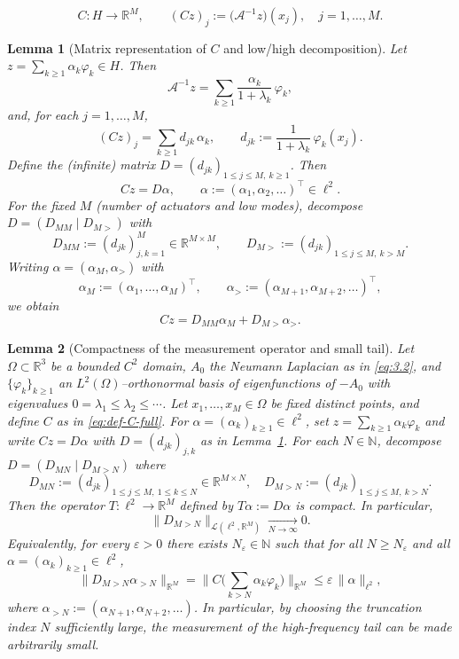 \documentclass[10pt,a4paper]{amsart}
\newtheorem{lemma}{Lemma}
\begin{document}
\begin{equation}
\label{eq:def-C-full}
C:H\to\mathbb{R}^M,\qquad
(Cz)_j := \big(\mathcal A^{-1}z\big)(x_j),\quad j=1,\dots,M.
\end{equation}

\begin{lemma}[Matrix representation of $C$ and low/high decomposition]
\label{lem:C-matrix}
Let $z=\sum_{k\ge1}\alpha_k\varphi_k\in H$. Then
\[
\mathcal A^{-1}z = \sum_{k\ge1}\frac{\alpha_k}{1+\lambda_k}\,\varphi_k,
\]
and, for each $j=1,\dots,M$,
\[
(Cz)_j = \sum_{k\ge1} d_{jk}\,\alpha_k,\qquad
d_{jk} := \frac{1}{1+\lambda_k}\,\varphi_k(x_j).
\]
Define the (infinite) matrix $D=(d_{jk})_{1\le j\le M,\ k\ge1}$. Then
\[
Cz = D\alpha,\qquad \alpha:=(\alpha_1,\alpha_2,\dots)^\top\in\ell^2.
\]
For the fixed $M$ (number of actuators and low modes), decompose
$D=(D_{MM}\;|\;D_{M>})$ with
\[
D_{MM} := (d_{jk})_{j,k=1}^M\in\mathbb{R}^{M\times M},\qquad
D_{M>} := (d_{jk})_{1\le j\le M,\ k>M}.
\]
Writing $\alpha=(\alpha_M,\alpha_>)$ with
\[
\alpha_M := (\alpha_1,\dots,\alpha_M)^\top,\qquad
\alpha_> := (\alpha_{M+1},\alpha_{M+2},\dots)^\top,
\]
we obtain
\begin{equation}
\label{eq:Cz-split}
Cz = D_{MM}\alpha_M + D_{M>}\alpha_>.
\end{equation}
\end{lemma}

\begin{lemma}[Compactness of the measurement operator and small tail]
\label{lem:tail-small-compact}
Let $\Omega\subset\mathbb{R}^3$ be a bounded $C^2$ domain, $A_0$ the Neumann
Laplacian as in \eqref{eq:3.2}, and $\{\varphi_k\}_{k\ge1}$ an
$L^2(\Omega)$–orthonormal basis of eigenfunctions of $-A_0$ with eigenvalues
$0=\lambda_1\le\lambda_2\le\cdots$. Let $x_1,\dots,x_M\in\Omega$ be fixed
distinct points, and define $C$ as in \eqref{eq:def-C-full}.
\newline
For $\alpha=(\alpha_k)_{k\ge1}\in\ell^2$, set $z=\sum_{k\ge1}\alpha_k\varphi_k$
and write $Cz=D\alpha$ with $D=(d_{jk})_{j,k}$ as in
Lemma~\ref{lem:C-matrix}. For each $N\in\mathbb{N}$, decompose
$D=(D_{MN}\mid D_{M> N})$ where
\[
D_{MN} := (d_{jk})_{1\le j\le M,\ 1\le k\le N}\in\mathbb{R}^{M\times N},\quad
D_{M> N} := (d_{jk})_{1\le j\le M,\ k>N}.
\]
\noindent
Then the operator $T:\ell^2\to\mathbb{R}^M$ defined by $T\alpha:=D\alpha$ is
compact. In particular,
\begin{equation}
\label{eq:Dtail-norm->0}
\|D_{M> N}\|_{\mathcal{L}(\ell^2,\mathbb{R}^M)} \xrightarrow[N\to\infty]{} 0.
\end{equation}
Equivalently, for every $\varepsilon>0$ there exists $N_\varepsilon\in\mathbb{N}$
such that for all $N\ge N_\varepsilon$ and all
$\alpha=(\alpha_k)_{k\ge1}\in\ell^2$,
\[
\big\|D_{M> N}\alpha_{>N}\big\|_{\mathbb{R}^M}
= \big\|C\Big( \sum_{k>N}\alpha_k\varphi_k \Big)\big\|_{\mathbb{R}^M}
\le \varepsilon\,\|\alpha\|_{\ell^2},
\]
where $\alpha_{>N} := (\alpha_{N+1},\alpha_{N+2},\dots)$.
In particular, by choosing the truncation index $N$ sufficiently large, the
measurement of the high-frequency tail can be made arbitrarily small.
\end{lemma}
\end{document}

